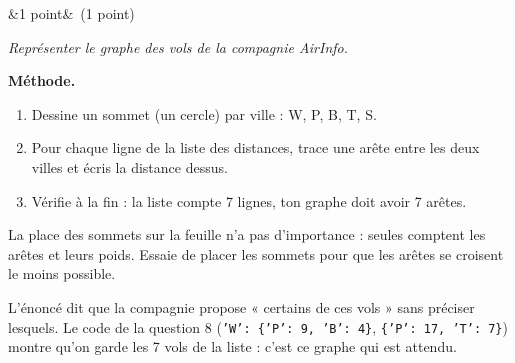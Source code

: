 \documentclass[11pt, a4paper]{exam}
\newcommand{\code}[1]{\texttt{#1}}
\newcommand{\Q}[3]{\par\needspace{5\baselineskip}\bigskip\noindent{\large\bfseries Question #1}\ifx&#2&\else\ \textnormal{(#2)}\fi\par\nopagebreak\smallskip\noindent\textit{#3}\par\nopagebreak\smallskip}
\newcommand{\methode}{\par\noindent\textbf{Méthode.}\ }
\begin{document}
\Q{7}{1 point}{Représenter le graphe des vols de la compagnie AirInfo.}
\begin{reponse}
\begin{center}
\end{center}
\end{reponse}
\methode
\begin{enumerate}
\item Dessine un sommet (un cercle) par ville : W, P, B, T, S.
\item Pour chaque ligne de la liste des distances, trace une arête entre les deux villes et écris la distance dessus.
\item Vérifie à la fin : la liste compte 7 lignes, ton graphe doit avoir 7 arêtes.
\end{enumerate}
La place des sommets sur la feuille n'a pas d'importance : seules comptent les arêtes et leurs poids. Essaie de placer les sommets pour que les arêtes se croisent le moins possible.
\begin{remarque}
L'énoncé dit que la compagnie propose « certains de ces vols » sans préciser lesquels. Le code de la question 8 (\code{'W': \{'P': 9, 'B': 4\}}, \code{\{'P': 17, 'T': 7\}}) montre qu'on garde les 7 vols de la liste : c'est ce graphe qui est attendu.
\end{remarque}
\end{document}

